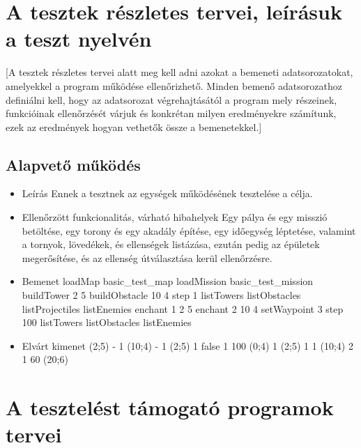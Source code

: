 \section{A tesztek részletes tervei, leírásuk a teszt nyelvén}
[A tesztek részletes tervei alatt meg kell adni azokat a bemeneti adatsorozatokat, amelyekkel a program működése ellenőrizhető. Minden bemenő adatsorozathoz definiálni kell, hogy az adatsorozat végrehajtásától a program mely részeinek, funkcióinak ellenőrzését várjuk és konkrétan milyen eredményekre számítunk, ezek az eredmények hogyan vethetők össze a bemenetekkel.]

\subsection{Alapvető működés}
\begin{itemize}
\item Leírás\newline
Ennek a tesztnek az egységek működésének tesztelése a célja.
\item Ellenőrzött funkcionalitás, várható hibahelyek
Egy pálya és egy misszió betöltése, egy torony és egy akadály építése, egy időegység léptetése, valamint a tornyok, lövedékek, és ellenségek listázása, ezután pedig az épületek megerősítése, és az ellenség útválasztása kerül ellenőrzésre.
\item Bemenet\newline
loadMap basic_test_map
loadMission basic_test_mission
buildTower 2 5
buildObstacle 10 4
step 1
listTowers
listObstacles
listProjectiles
listEnemies
enchant 1 2 5
enchant 2 10 4
setWaypoint 3
step 100
listTowers
listObstacles
listEnemies
\item Elvárt kimenet	(2;5)	-
1	(10;4)	-
1	(2;5)	1	false
1	100	(0;4)
1	(2;5)	1
1	(10;4)	2
1	60	(20;6)
\end{itemize}

\section{A tesztelést támogató programok tervei}

